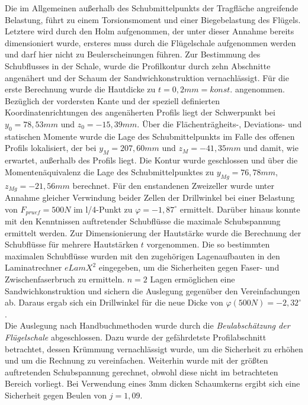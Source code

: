\noindent Die im Allgemeinen außerhalb des Schubmittelpunkts der Tragfläche angreifende Belastung, führt zu einem Torsionsmoment und einer Biegebelastung des Flügels. Letztere wird durch den Holm aufgenommen, der unter dieser Annahme bereits dimensioniert wurde, ersteres muss durch die Flügelschale aufgenommen werden und darf hier nicht zu Beulerscheinungen führen. Zur Bestimmung des Schubflusses in der Schale, wurde die Profilkontur durch zehn Abschnitte angenähert und der Schaum der Sandwichkonstruktion vernachlässigt. Für die erste Berechnung wurde die Hautdicke zu $ t=0,2mm=konst. $ angenommen. Bezüglich der vordersten Kante und der speziell definierten Koordinatenrichtungen des angenäherten Profils liegt der Schwerpunkt bei $ y_{0}=78,53mm $ und $ z_{0}=-15,39mm $. Über die Flächenträgheits-, Deviations- und statischen Momente wurde die Lage des Schubmittelpunkts im Falle des offenen Profils lokalisiert, der bei $ y_{M}=207,60mm $ und $ z_{M}=-41,35mm $ und damit, wie erwartet, außerhalb des Profils liegt. Die Kontur wurde geschlossen und über die Momentenäquivalenz die Lage des Schubmittelpunktes zu $ y_{Mg}=76,78mm $, $ z_{Mg}=-21,56mm $ berechnet. Für den enstandenen Zweizeller wurde unter Annahme gleicher Verwindung beider Zellen der Drillwinkel bei einer Belastung von $ F_{pruef}=500N $ im l/4-Punkt zu $ \varphi=-1,87^{\circ} $ ermittelt. Darüber hinaus konnte mit den Kenntnissen auftretender Schubflüsse die maximale Schubspannung ermittelt werden. Zur Dimensionierung der Hautstärke wurde die Berechnung der Schubflüsse für mehrere Hautstärken $ t $ vorgenommen. Die so bestimmten maximalen Schubflüsse wurden mit den zugehörigen Lagenaufbauten in den Laminatrechner $ eLamX^{2} $ eingegeben, um die Sicherheiten gegen Faser- und Zwischenfaserbruch zu ermitteln. $ n=2 $ Lagen ermöglichen eine Sandwichkonstruktion und sichern die Auslegung gegenüber den Vereinfachungen ab. Daraus ergab sich ein Drillwinkel für die neue Dicke von $ \varphi(500N)=-2,32^{\circ} $.\\

\noindent Die Auslegung nach Handbuchmethoden wurde durch die \textit{Beulabschätzung der Flügelschale} abgeschlossen. Dazu wurde der gefährdetste Profilabschnitt betrachtet, dessen Krümmung vernachlässigt wurde, um die Sicherheit zu erhöhen und um die Rechnung zu vereinfachen. Weiterhin wurde mit der größten auftretenden Schubspannung gerechnet, obwohl diese nicht im betrachteten Bereich vorliegt. Bei Verwendung eines 3mm dicken Schaumkerns ergibt sich eine Sicherheit gegen Beulen von $ j=1,09 $.

